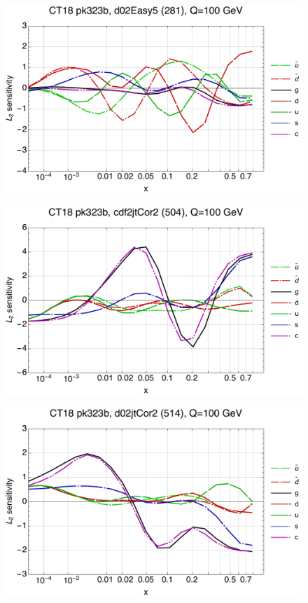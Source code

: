 \documentclass[10pt,aps,prd,floatfix,titlepage]{revtex4}
\begin{document}
\clearpage
\begin{figure}
\includegraphics[width=\textwidth,height=0.44\textheight,keepaspectratio]{1/281_ct18nn_L2_q100_Sf_1.pdf}
\caption{}
\end{figure}
\begin{figure}
\includegraphics[width=\textwidth,height=0.44\textheight,keepaspectratio]{1/504_ct18nn_L2_q100_Sf_1.pdf}
\caption{}
\end{figure}
\clearpage
\begin{figure}
\includegraphics[width=\textwidth,height=0.44\textheight,keepaspectratio]{1/514_ct18nn_L2_q100_Sf_1.pdf}
\caption{}
\end{figure}
\end{document}
